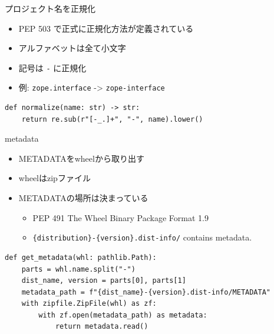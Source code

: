 \documentclass[presentation]{beamer}
\begin{document}
\begin{frame}[label={sec:org9a50dd6},fragile]{プロジェクト名を正規化}
 \begin{itemize}
\item PEP 503 で正式に正規化方法が定義されている
\item アルファベットは全て小文字
\item 記号は \texttt{-} に正規化
\item 例: \texttt{zope.interface} -> \texttt{zope-interface}
\end{itemize}

\begin{verbatim}
def normalize(name: str) -> str:
    return re.sub(r"[-_.]+", "-", name).lower()
\end{verbatim}
\end{frame}

\begin{frame}[label={sec:orgc133b0d},fragile]{metadata}
 \begin{itemize}
\item METADATAをwheelから取り出す
\item wheelはzipファイル
\item METADATAの場所は決まっている
\begin{itemize}
\item PEP 491 The Wheel Binary Package Format 1.9
\item \texttt{\{distribution\}-\{version\}.dist-info/} contains metadata.
\end{itemize}
\end{itemize}

\begin{verbatim}
def get_metadata(whl: pathlib.Path):
    parts = whl.name.split("-")
    dist_name, version = parts[0], parts[1]
    metadata_path = f"{dist_name}-{version}.dist-info/METADATA"
    with zipfile.ZipFile(whl) as zf:
        with zf.open(metadata_path) as metadata:
            return metadata.read()

\end{verbatim}
\end{frame}
\end{document}
